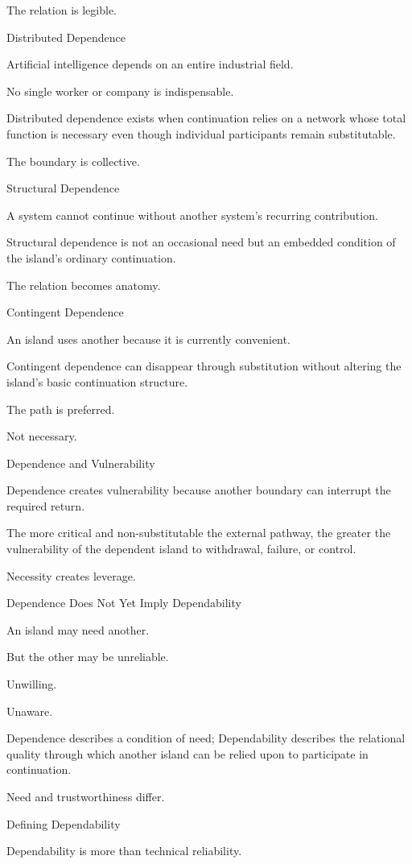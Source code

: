 The relation is legible.

Distributed Dependence

Artificial intelligence depends on an entire industrial field.

No single worker or company is indispensable.

Distributed dependence exists when continuation relies on a network whose total function is necessary even though individual participants remain substitutable.

The boundary is collective.

Structural Dependence

A system cannot continue without another system’s recurring contribution.

Structural dependence is not an occasional need but an embedded condition of the island’s ordinary continuation.

The relation becomes anatomy.

Contingent Dependence

An island uses another because it is currently convenient.

Contingent dependence can disappear through substitution without altering the island’s basic continuation structure.

The path is preferred.

Not necessary.

Dependence and Vulnerability

Dependence creates vulnerability because another boundary can interrupt the required return.

The more critical and non-substitutable the external pathway, the greater the vulnerability of the dependent island to withdrawal, failure, or control.

Necessity creates leverage.

Dependence Does Not Yet Imply Dependability

An island may need another.

But the other may be unreliable.

Unwilling.

Unaware.

Dependence describes a condition of need; Dependability describes the relational quality through which another island can be relied upon to participate in continuation.

Need and trustworthiness differ.

Defining Dependability

Dependability is more than technical reliability.

